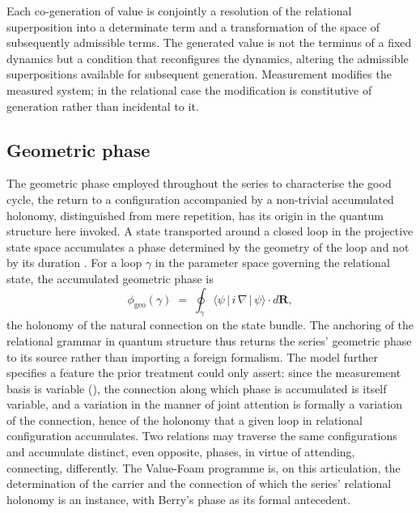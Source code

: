 \begin{claim}
Each co-generation of value is conjointly a resolution of the relational superposition into a determinate term and a transformation of the space of subsequently admissible terms. The generated value is not the terminus of a fixed dynamics but a condition that reconfigures the dynamics, altering the admissible superpositions available for subsequent generation. Measurement modifies the measured system; in the relational case the modification is constitutive of generation rather than incidental to it.
\end{claim}

\subsection{Geometric phase}
\label{p10:sec:phase-source}

The geometric phase employed throughout the series to characterise the good cycle, the return to a configuration accompanied by a non-trivial accumulated holonomy, distinguished from mere repetition, has its origin in the quantum structure here invoked. A state transported around a closed loop in the projective state space accumulates a phase determined by the geometry of the loop and not by its duration \parencite{berry1984,pancharatnam1956,aharonov1987}. For a loop $\gamma$ in the parameter space governing the relational state, the accumulated geometric phase is
\[
\phi_{\mathrm{geo}}(\gamma) \;=\; \oint_\gamma \langle \psi \,|\, i\,\nabla \,|\, \psi \rangle \cdot d\mathbf{R},
\]
the holonomy of the natural connection on the state bundle. The anchoring of the relational grammar in quantum structure thus returns the series' geometric phase to its source rather than importing a foreign formalism. The model further specifies a feature the prior treatment could only assert: since the measurement basis is variable (), the connection along which phase is accumulated is itself variable, and a variation in the manner of joint attention is formally a variation of the connection, hence of the holonomy that a given loop in relational configuration accumulates. Two relations may traverse the same configurations and accumulate distinct, even opposite, phases, in virtue of attending, connecting, differently. The Value-Foam programme is, on this articulation, the determination of the carrier and the connection of which the series' relational holonomy is an instance, with Berry's phase as its formal antecedent.

